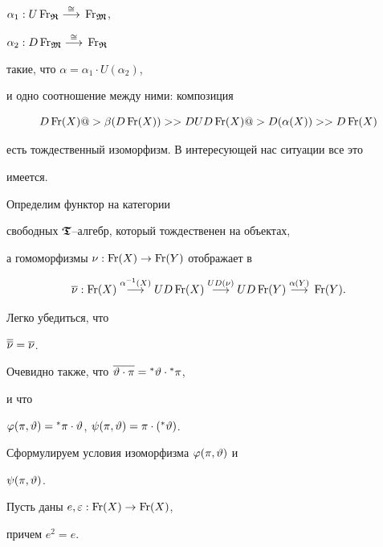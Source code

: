 $\alpha_1 : U\operatorname{Fr}_{\boldsymbol{\frak R}} \overset{\cong}{\longrightarrow}{} \operatorname{Fr}_{\boldsymbol{\frak M}}$,


$\alpha_2 : D\operatorname{Fr}_{\boldsymbol{\frak M}} \overset{\cong}{\longrightarrow}{} \operatorname{Fr}_{\boldsymbol{\frak R}}$


такие, что $\alpha =\alpha_1\cdot U(\alpha_2)$,


и одно соотношение между ними: композиция


$$


D\Fr(X)@>{\beta(D\Fr(X))}>>


DUD\Fr(X) @>{D(\alpha(X))}>> D\Fr(X)


$$


есть тождественный изоморфизм. В интересующей нас ситуации все это


имеется.





Определим функтор на категории


свободных $\boldsymbol{\frak T}$--алгебр, который тождественен на объектах,


а гомоморфизмы $\nu: \operatorname{Fr}(X)\to \operatorname{Fr}(Y)$ отображает в


$$


\o{\nu}: \Fr(X)\ar{\alpha^{-1}(X)}UD\Fr(X)\ar{UD(\nu)}


UD\Fr(Y)\ar{\alpha(Y)} \Fr(Y).


$$


Легко убедиться, что


$\overline{\overline{\nu}}=\overline{\nu}$.


Очевидно также, что $\overline{\vartheta\cdot\pi}={}^{\ast}{\vartheta}\cdot{}^{\ast}{\pi}$,


и что


$\varphi(\pi,\vartheta)={}^{\ast}{\pi}\cdot\vartheta$, $\psi(\pi,\vartheta)=\pi\cdot({}^{\ast}{\vartheta})$.





Сформулируем условия изоморфизма $\varphi(\pi,\vartheta)$ и


$\psi(\pi,\vartheta)$.


Пусть даны $e,\varepsilon:\operatorname{Fr}(X)\to \operatorname{Fr}(X)$,


причем $e^2=e $.


$$


